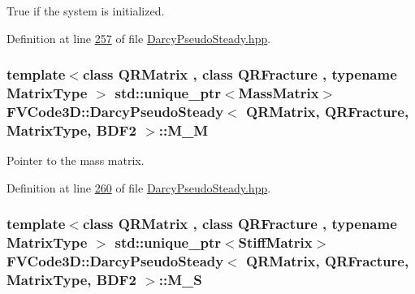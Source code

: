 True if the system is initialized. 



Definition at line \hyperlink{DarcyPseudoSteady_8hpp_source_l00257}{257} of file \hyperlink{DarcyPseudoSteady_8hpp_source}{Darcy\+Pseudo\+Steady.\+hpp}.

\subsubsection[{\texorpdfstring{M\+\_\+M}{M_M}}]{\setlength{\rightskip}{0pt plus 5cm}template$<$class Q\+R\+Matrix , class Q\+R\+Fracture , typename Matrix\+Type $>$ std\+::unique\+\_\+ptr$<${\bf Mass\+Matrix}$>$ {\bf F\+V\+Code3\+D\+::\+Darcy\+Pseudo\+Steady}$<$ Q\+R\+Matrix, Q\+R\+Fracture, Matrix\+Type, {\bf B\+D\+F2} $>$\+::M\+\_\+M\hspace{0.3cm}{\ttfamily [protected]}}\hypertarget{classFVCode3D_1_1DarcyPseudoSteady_3_01QRMatrix_00_01QRFracture_00_01MatrixType_00_01BDF2_01_4_a925affb9e3841f7f9da63e45474a1291}{}\label{classFVCode3D_1_1DarcyPseudoSteady_3_01QRMatrix_00_01QRFracture_00_01MatrixType_00_01BDF2_01_4_a925affb9e3841f7f9da63e45474a1291}


Pointer to the mass matrix. 



Definition at line \hyperlink{DarcyPseudoSteady_8hpp_source_l00260}{260} of file \hyperlink{DarcyPseudoSteady_8hpp_source}{Darcy\+Pseudo\+Steady.\+hpp}.

\subsubsection[{\texorpdfstring{M\+\_\+S}{M_S}}]{\setlength{\rightskip}{0pt plus 5cm}template$<$class Q\+R\+Matrix , class Q\+R\+Fracture , typename Matrix\+Type $>$ std\+::unique\+\_\+ptr$<${\bf Stiff\+Matrix}$>$ {\bf F\+V\+Code3\+D\+::\+Darcy\+Pseudo\+Steady}$<$ Q\+R\+Matrix, Q\+R\+Fracture, Matrix\+Type, {\bf B\+D\+F2} $>$\+::M\+\_\+S\hspace{0.3cm}{\ttfamily [protected]}}\hypertarget{classFVCode3D_1_1DarcyPseudoSteady_3_01QRMatrix_00_01QRFracture_00_01MatrixType_00_01BDF2_01_4_aec1af52be19e9b13e127e1738104ef73}{}\label{classFVCode3D_1_1DarcyPseudoSteady_3_01QRMatrix_00_01QRFracture_00_01MatrixType_00_01BDF2_01_4_aec1af52be19e9b13e127e1738104ef73}


